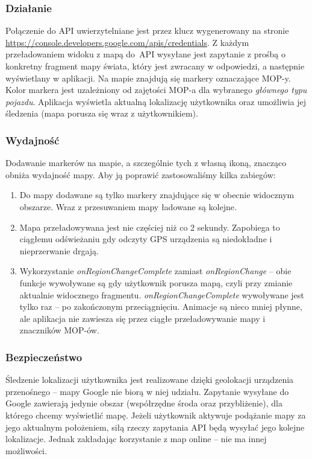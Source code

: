 \subsubsection{Działanie}
Połączenie do API uwierzytelniane jest przez klucz wygenerowany na stronie \url{https://console.developers.google.com/apis/credentials}. Z każdym przeładowaniem widoku z mapą do~API wysyłane jest zapytanie z prośbą o konkretny fragment mapy świata, który jest zwracany w odpowiedzi, a następnie wyświetlany w aplikacji. Na mapie znajdują się markery oznaczające MOP-y. Kolor markera jest uzależniony od zajętości MOP-a dla wybranego \textit{głównego typu pojazdu}. Aplikacja wyświetla aktualną lokalizację użytkownika oraz umożliwia jej śledzenia (mapa porusza się wraz z użytkownikiem). 
\subsubsection{Wydajność}
Dodawanie markerów na mapie, a szczególnie tych z własną ikoną, znacząco obniża wydajność mapy. Aby ją poprawić zastosowaliśmy kilka zabiegów:
\begin{enumerate}
\item Do mapy dodawane są tylko markery znajdujące się w obecnie widocznym obszarze. Wraz z przesuwaniem mapy ładowane są kolejne.
\item Mapa przeładowywana jest nie częściej niż co 2 sekundy. Zapobiega to ciągłemu odświeżaniu gdy odczyty GPS urządzenia są niedokładne i nieprzerwanie drgają.
\item Wykorzystanie \textit{onRegionChangeComplete} zamiast \textit{onRegionChange} -- obie funkcje wywoływane są gdy użytkownik porusza mapą, czyli przy zmianie aktualnie widocznego fragmentu. \textit{onRegionChangeComplete} wywoływane jest tylko raz -- po zakończonym przeciągnięciu. Animacje są nieco mniej płynne, ale aplikacja nie zawiesza się przez ciągłe przeładowywanie mapy i znaczników MOP-ów.
\end{enumerate}
\subsubsection{Bezpieczeństwo}
Śledzenie lokalizacji użytkownika jest realizowane dzięki geolokacji urządzenia przenośnego -- mapy Google nie biorą w niej udziału. Zapytanie wysyłane do Google zawierają jedynie obszar (współrzędne środa oraz przybliżenie), dla którego chcemy wyświetlić mapę. Jeżeli użytkownik aktywuje podążanie mapy za jego aktualnym położeniem, siłą rzeczy zapytania API będą wysyłać jego kolejne lokalizacje. Jednak zakładając korzystanie z map online -- nie ma innej możliwości. 

